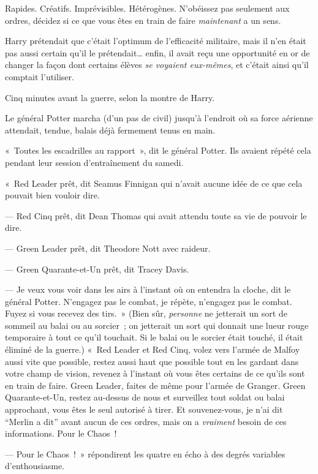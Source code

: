 Rapides. Créatifs. Imprévisibles. Hétérogènes. N'obéissez pas seulement aux ordres, décidez si ce que vous êtes en train de faire \emph{maintenant} a un sens.

Harry prétendait que c'était l'optimum de l'efficacité militaire, mais il n'en était pas aussi certain qu'il le prétendait… enfin, il avait reçu une opportunité en or de changer la façon dont certains élèves \emph{se voyaient eux-mêmes}, et c'était ainsi qu'il comptait l'utiliser.

Cinq minutes avant la guerre, selon la montre de Harry.

Le général Potter marcha (d'un pas de civil) jusqu'à l'endroit où sa force aérienne attendait, tendue, balais déjà fermement tenus en main.

«~Toutes les escadrilles au rapport~», dit le général Potter. Ils avaient répété cela pendant leur session d'entraînement du samedi.

«~Red Leader prêt, dit Seamus Finnigan qui n'avait aucune idée de ce que cela pouvait bien vouloir dire.

--- Red Cinq prêt, dit Dean Thomas qui avait attendu toute sa vie de pouvoir le dire.

--- Green Leader prêt, dit Theodore Nott avec raideur.

--- Green Quarante-et-Un prêt, dit Tracey Davis.

--- Je veux vous voir dans les airs à l'instant où on entendra la cloche, dit le général Potter. N'engagez pas le combat, je répète, n'engagez pas le combat. Fuyez si vous recevez des tirs.~» (Bien sûr, \emph{personne} ne jetterait un sort de sommeil au balai ou au sorcier~; on jetterait un sort qui donnait une lueur rouge temporaire à tout ce qu'il touchait. Si le balai ou le sorcier était touché, il était éliminé de la guerre.) «~Red Leader et Red Cinq, volez vers l'armée de Malfoy aussi vite que possible, restez aussi haut que possible tout en les gardant dans votre champ de vision, revenez à l'instant où vous êtes certains de ce qu'ils sont en train de faire. Green Leader, faites de même pour l'armée de Granger. Green Quarante-et-Un, restez au-dessus de nous et surveillez tout soldat ou balai approchant, vous êtes le seul autorisé à tirer. Et souvenez-vous, je n'ai dit “Merlin a dit” avant aucun de ces ordres, mais on a \emph{vraiment} besoin de ces informations. Pour le Chaos~!

--- Pour le Chaos~!~» répondirent les quatre en écho à des degrés variables d'enthousiasme.

